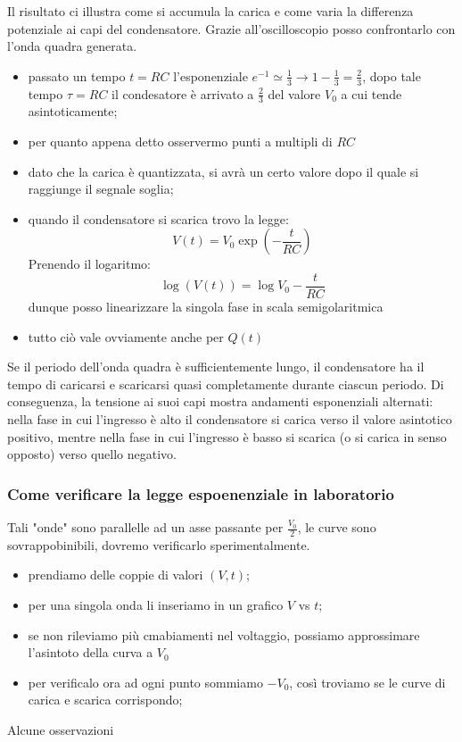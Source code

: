\documentclass{article}
\begin{document}
Il risultato ci illustra come si accumula la carica e  come varia la differenza potenziale ai capi del condensatore. Grazie all'oscilloscopio posso confrontarlo con l'onda quadra generata. 
\begin{itemize}
    \item passato un tempo $t=RC$ l'esponenziale $e^{-1} \simeq \frac{1}{3} \rightarrow 1-\frac{1}{3} = \frac{2}{3}$,
    dopo tale tempo $ \tau =RC$ il condesatore è arrivato a $\frac{2}{3}$ del valore $V_0$ a cui tende asintoticamente;
    \item per quanto appena detto osservermo punti a multipli di $RC$
    \item dato che la carica è quantizzata, si avrà un certo valore dopo il quale si raggiunge il segnale soglia;
    \item quando il condensatore si scarica trovo la legge:\[ V(t)= V_0 \exp(-\frac{t}{RC})\]
    Prenendo il logaritmo:
    \[
    \log (V(t)) = \log V_0 - \frac{t}{RC}
    \]
    dunque posso linearizzare la singola fase in scala semigolaritmica
    \item tutto ciò vale ovviamente anche per $Q(t)$
\end{itemize}
Se il periodo dell'onda quadra è sufficientemente lungo, il condensatore ha il tempo di caricarsi e scaricarsi 
quasi completamente durante ciascun periodo. Di conseguenza, la tensione ai suoi capi mostra andamenti esponenziali alternati: 
nella fase in cui l’ingresso è alto il condensatore si carica verso il valore asintotico positivo, mentre nella fase in cui
l’ingresso è basso si scarica (o si carica in senso opposto) verso quello negativo.


\subsubsection{Come verificare la legge espoenenziale in laboratorio}
Tali "onde" sono parallelle ad un asse passante per $\frac{V_0}{2}$, le curve sono sovrappobinibili, dovremo verificarlo sperimentalmente.
\begin{itemize}
    \item prendiamo delle coppie di valori $(V,t)$;
    \item per una singola onda li inseriamo in un grafico $V$ vs $t$;
    \item se non rileviamo più cmabiamenti nel voltaggio, possiamo approssimare l'asintoto della curva a $V_0$
    \item per verificalo ora ad ogni punto sommiamo $- V_0$, così troviamo se le curve di carica e scarica corrispondo;
\end{itemize}
Alcune osservazioni
\end{document}
